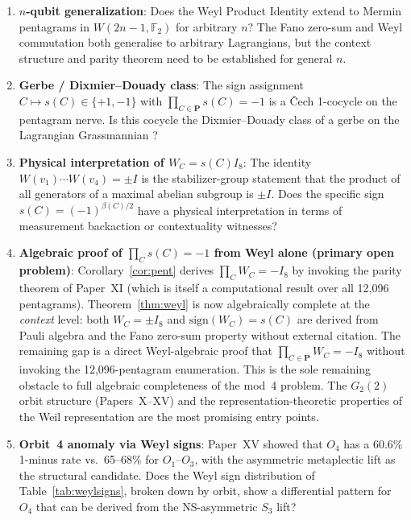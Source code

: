 \documentclass[11pt,a4paper]{article}
\theoremstyle{remark}
\begin{document}
\begin{enumerate}
  \item \textbf{$n$-qubit generalization}:
        Does the Weyl Product Identity extend to Mermin pentagrams in
        $W(2n-1, \mathbb{F}_2)$ for arbitrary $n$?
        The Fano zero-sum and Weyl commutation both generalise to
        arbitrary Lagrangians, but the context structure and parity theorem
        need to be established for general $n$.

  \item \textbf{Gerbe / Dixmier--Douady class}:
        The sign assignment $C \mapsto s(C) \in \{+1,-1\}$
        with $\prod_{C \in \mathbf{P}} s(C) = -1$ is a
        \v{C}ech 1-cocycle on the pentagram nerve.
        Is this cocycle the Dixmier--Douady class of a gerbe on the
        Lagrangian Grassmannian
        \cite{DixmierDouady,Brylinski1993}?

  \item \textbf{Physical interpretation of $W_C = s(C)I_8$}:
        The identity $W(v_1) \cdots W(v_4) = \pm I$ is the
        stabilizer-group statement that the product of all generators
        of a maximal abelian subgroup is $\pm I$.
        Does the specific sign $s(C) = (-1)^{\beta(C)/2}$ have a
        physical interpretation in terms of measurement backaction or
        contextuality witnesses?

  \item \textbf{Algebraic proof of $\prod_C s(C) = -1$ from Weyl alone
        (primary open problem)}:
        Corollary~\ref{cor:pent} derives $\prod_C W_C = -I_8$
        by invoking the parity theorem of Paper~XI \cite{PaperXI}
        (which is itself a computational result over all 12{,}096 pentagrams).
        Theorem~\ref{thm:weyl} is now algebraically complete at the
        \emph{context} level: both $W_C = \pm I_8$ and
        $\mathrm{sign}(W_C) = s(C)$ are derived from Pauli algebra
        and the Fano zero-sum property without external citation.
        The remaining gap is a direct Weyl-algebraic proof that
        $\prod_{C \in \mathbf{P}} W_C = -I_8$ without invoking the
        12{,}096-pentagram enumeration.
        This is the sole remaining obstacle to full algebraic
        completeness of the mod~4 problem.
        The $G_2(2)$ orbit structure (Papers~X--XV) and the
        representation-theoretic properties of the Weil representation
        are the most promising entry points.

  \item \textbf{Orbit~4 anomaly via Weyl signs}:
        Paper~XV showed that $O_4$ has a 60.6\% 1-minus rate vs.\
        65--68\% for $O_1$--$O_3$, with the asymmetric metaplectic
        lift as the structural candidate.
        Does the Weyl sign distribution of Table~\ref{tab:weylsigns},
        broken down by orbit, show a differential pattern for $O_4$
        that can be derived from the NS-asymmetric $S_3$ lift?
\end{enumerate}
\end{document}
